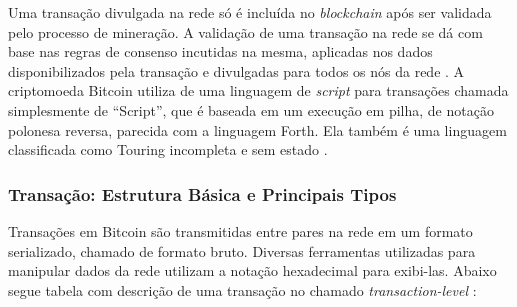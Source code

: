 \documentclass[
	article,			%
	11pt,				%
	oneside,			%
	a4paper,			%
	chapter=TITLE,		%
	section=TITLE,		%
	subsection=TITLE,	%
	subsubsection=TITLE, %
	english,			%
	brazil,				%
	sumario=tradicional
	]{ifrs-artigo-abntex2}
\begin{document}
Uma transação divulgada na rede só é incluída no \textit{blockchain} após ser validada pelo processo de mineração. A validação de uma transação na rede se dá com base nas regras de consenso incutidas na mesma, aplicadas nos dados disponibilizados pela transação e divulgadas para todos os nós da rede \cite{masterBit}.
A criptomoeda Bitcoin utiliza de uma linguagem de \textit{script} para transações chamada simplesmente de “Script”, que é baseada em um execução em pilha, de notação polonesa reversa, parecida com a linguagem Forth. Ela também é uma linguagem classificada como Touring incompleta e sem estado \cite{masterBit}.

\subsubsection{Transação: Estrutura Básica e Principais Tipos}
Transações em Bitcoin são transmitidas entre pares na rede em um formato serializado, chamado de formato bruto. Diversas ferramentas utilizadas para manipular dados da rede utilizam a notação hexadecimal para exibi-las. Abaixo segue tabela com descrição de uma transação no chamado \textit{transaction-level} \cite{bitcoinDev}:

\begin{table}[htb]
\end{table}
\end{document}
